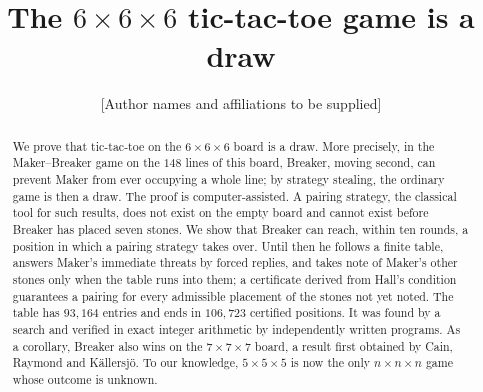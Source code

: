 \title[$6\times6\times6$ tic-tac-toe is a draw]{The $6\times6\times6$ tic-tac-toe game is a draw}

\author{[Author names and affiliations to be supplied]}



\begin{abstract}
We prove that tic-tac-toe on the $6\times6\times6$ board is a draw. More precisely, in the
Maker--Breaker game on the $148$ lines of this board, Breaker, moving second, can prevent Maker from ever
occupying a whole line; by strategy stealing, the ordinary game is then a draw. The proof is
computer-assisted. A pairing strategy, the classical tool for such results, does not exist on the empty
board and cannot exist before Breaker has placed seven stones. We show that Breaker can reach, within ten
rounds, a position in which a pairing strategy takes over. Until then he follows a finite table, answers
Maker's immediate threats by forced replies, and takes note of Maker's other stones only when the table
runs into them; a certificate derived from Hall's condition guarantees a pairing for every admissible
placement of the stones not yet noted. The table has $93{,}164$ entries and ends in $106{,}723$ certified
positions. It was found by a search and verified in exact integer arithmetic by independently written
programs. As a corollary, Breaker also wins on the $7\times7\times7$ board, a result first obtained by
Cain, Raymond and K\"allersj\"o. To our knowledge, $5\times5\times5$ is now the only
$n\times n\times n$ game whose outcome is unknown.
\end{abstract}

\maketitle

\setcounter{tocdepth}{1}
\tableofcontents

